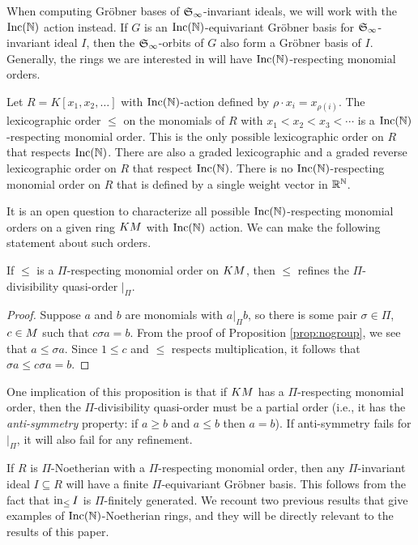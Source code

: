 When computing Gr\"obner bases of $\mathfrak S_\infty$-invariant ideals, we will work with the $\operatorname{Inc}(\mathbb N)$ action instead.  If $G$ is an $\operatorname{Inc}(\mathbb N)$-equivariant Gr\"obner basis for $\mathfrak S_\infty$-invariant ideal $I$, then the $\mathfrak S_\infty$-orbits of $G$ also form a Gr\"obner basis of $I$.  Generally, the rings we are interested in will have $\operatorname{Inc}(\mathbb N)$-respecting monomial orders.

\begin{example}
 Let $R = K[x_1,x_2,\ldots]$ with $\operatorname{Inc}(\mathbb N)$-action defined by $\rho \cdot x_i = x_{\rho(i)}$.  The lexicographic order $\leq$ on the monomials of $R$ with $x_1 < x_2 < x_3 < \cdots$ is a $\operatorname{Inc}(\mathbb N)$-respecting monomial order.  This is the only possible lexicographic order on $R$ that respects $\operatorname{Inc}(\mathbb N)$.  There are also a graded lexicographic and a graded reverse lexicographic order on $R$ that respect $\operatorname{Inc}(\mathbb N)$.  There is no $\operatorname{Inc}(\mathbb N)$-respecting monomial order on $R$ that is defined by a single weight vector in $\mathbb R^{\mathbb N}$.
\end{example}

It is an open question to characterize all possible $\operatorname{Inc}(\mathbb N)$-respecting monomial orders on a given ring $KM$ with $\operatorname{Inc}(\mathbb N)$ action.  We can make the following statement about such orders.

\begin{proposition}
 If $\leq$ is a $\Pi$-respecting monomial order on $KM$, then $\leq$ refines the $\Pi$-divisibility quasi-order $|_\Pi$.
\end{proposition}
\begin{proof}
 Suppose $a$ and $b$ are monomials with $a |_\Pi b$, so there is some pair $\sigma \in \Pi$, $c \in M$ such that $c\sigma a = b$.  From the proof of Proposition \ref{prop:nogroup}, we see that $a \leq \sigma a$.  Since $1 \leq c$ and $\leq$ respects multiplication, it follows that $\sigma a \leq c\sigma a = b$.
\end{proof}

One implication of this proposition is that if $KM$ has a $\Pi$-respecting monomial order, then the $\Pi$-divisibility quasi-order must be a partial order (i.e., it has the \textit{anti-symmetry} property: if $a \geq b$ and $a \leq b$ then $a = b$).  If anti-symmetry fails for $|_\Pi$, it will also fail for any refinement.

If $R$ is $\Pi$-Noetherian with a $\Pi$-respecting monomial order, then any $\Pi$-invariant ideal $I \subseteq R$ will have a finite $\Pi$-equivariant Gr\"obner basis.  This follows from the fact that $\operatorname{in}_{\leq} I$ is $\Pi$-finitely generated.  We recount two previous results that give examples of $\operatorname{Inc}(\mathbb N)$-Noetherian rings, and they will be directly relevant to the results of this paper.

